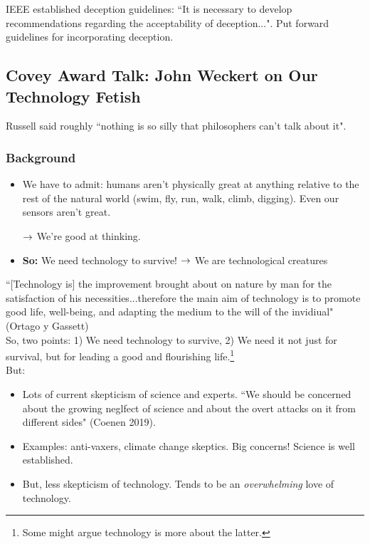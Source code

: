 IEEE established deception guidelines: ``It is necessary to develop recommendations regarding the acceptability of deception...". Put forward guidelines for incorporating deception.

\spacerule

\subsection{Covey Award Talk: John Weckert on Our Technology Fetish}


Russell said roughly ``nothing is so silly that philosophers can't talk about it". \\

\subsubsection{Background}

\begin{itemize}
\item We have to admit: humans aren't physically great at anything relative to the rest of the natural world (swim, fly, run, walk, climb, digging). Even our sensors aren't great.

$\rightarrow$ We're good at thinking.

\item {\bf So:} We need technology to survive!
$\rightarrow$ We are technological creatures
\end{itemize}

``[Technology is] the improvement brought about on nature by man for the satisfaction of his necessities...therefore the main aim of technology is to promote good life, well-being, and adapting the medium to the will of the invidiual" (Ortago y Gassett) \\

So, two points: 1) We need technology to survive, 2) We need it not just for survival, but for leading a good and flourishing life.\footnote{Some might argue technology is more about the latter.} \\

But:
\begin{itemize}
	\item Lots of current skepticism of science and experts.
	``We should be concerned about the growing neglfect of science and about the overt attacks on it from different sides" (Coenen 2019).

	\item Examples: anti-vaxers, climate change skeptics. Big concerns! Science is well established.

	\item But, less skepticism of technology. Tends to be an {\it overwhelming} love of technology.
\end{itemize}

